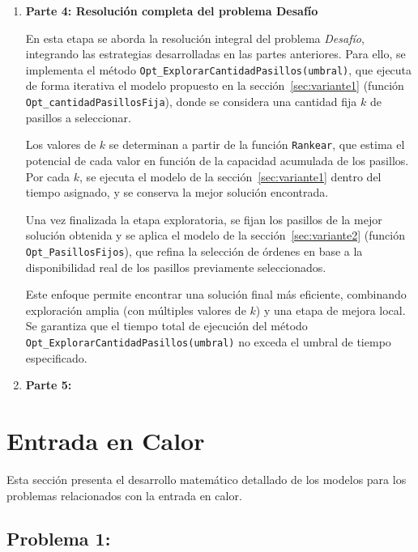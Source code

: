 \documentclass[a4paper,12pt]{article}
\begin{document}
\begin{enumerate}
    \item \textbf{Parte 4: Resolución completa del problema Desafío}

    En esta etapa se aborda la resolución integral del problema \textit{Desafío}, integrando las estrategias desarrolladas en las partes anteriores. Para ello, se implementa el método \texttt{Opt\_ExplorarCantidadPasillos(umbral)}, que ejecuta de forma iterativa el modelo propuesto en la sección~\ref{sec:variante1} (función \texttt{Opt\_cantidadPasillosFija}), donde se considera una cantidad fija \(k\) de pasillos a seleccionar.
    
    Los valores de \(k\) se determinan a partir de la función \texttt{Rankear}, que estima el potencial de cada valor en función de la capacidad acumulada de los pasillos. Por cada \(k\), se ejecuta el modelo de la sección~\ref{sec:variante1} dentro del tiempo asignado, y se conserva la mejor solución encontrada.
    
    Una vez finalizada la etapa exploratoria, se fijan los pasillos de la mejor solución obtenida y se aplica el modelo de la sección~\ref{sec:variante2} (función \texttt{Opt\_PasillosFijos}), que refina la selección de órdenes en base a la disponibilidad real de los pasillos previamente seleccionados.
    
    Este enfoque permite encontrar una solución final más eficiente, combinando exploración amplia (con múltiples valores de \(k\)) y una etapa de mejora local. Se garantiza que el tiempo total de ejecución del método \texttt{Opt\_ExplorarCantidadPasillos(umbral)} no exceda el umbral de tiempo especificado.


    

    \item \textbf{Parte 5: }
    
    
\end{enumerate}

\clearpage

\section{Entrada en Calor}

Esta sección presenta el desarrollo matemático detallado de los modelos para los problemas relacionados con la entrada en calor.

\subsection{Problema 1:}
\label{sec:probl1}
\end{document}

